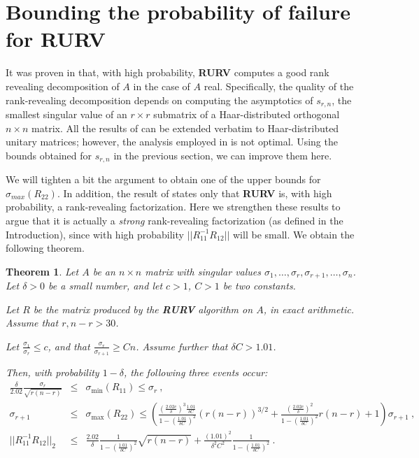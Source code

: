 \documentclass{article}
\newtheorem{theorem}{Theorem}[section]
\theoremstyle{definition}
\newcommand{\smin}{s_{r,n}}
\begin{document}
\section{Bounding the probability of failure for RURV}

It was proven in \cite{DDH07} that, with high probability, \textbf{RURV} computes a good rank revealing decomposition of $A$ in the case of $A$ real. Specifically, the quality of the rank-revealing decomposition depends on computing the asymptotics of $\smin$, the smallest singular value of an $r \times r$ submatrix of a Haar-distributed orthogonal $n \times n$ matrix. All the results of \cite{DDH07} can be extended verbatim to Haar-distributed unitary matrices; however, the analysis employed in \cite{DDH07} is not optimal. Using the bounds obtained for $\smin$ in the previous section, we can improve them here. 

We will tighten a bit the argument to obtain one of the upper bounds for $\sigma_{max}(R_{22})$. In addition, the result of \cite{DDH07} states only that \textbf{RURV} is, with high probability, a rank-revealing factorization. Here we strengthen these
results to argue that it is actually a \emph{strong} rank-revealing
factorization (as defined in the Introduction), since with high probability $||R_{11}^{-1} R_{12}||$ will be small. We obtain the following theorem. 


\begin{theorem} \label{thm_rurv}  Let $A$ be an $n \times n$ matrix
  with singular values $\sigma_1, \ldots, \sigma_r, \sigma_{r+1},
  \ldots, \sigma_n$. Let $\delta>0$ be a small number, and let $c>1$, $C >1$ be two constants. 

Let $R$ be the matrix produced by the \textbf{RURV} algorithm on $A$, \emph{in
    exact arithmetic}.  Assume that $r, n-r > 30$. 

Let $\frac{\sigma_1}{\sigma_r} \leq c$, and that $\frac{\sigma_{r}}{\sigma_{r+1}} \geq C n$. Assume further that $\delta C > 1.01$. 

Then, with probability $1-\delta$, the following three events occur:
\begin{eqnarray}
\label{unu} \frac{\delta}{2.02} \frac{\sigma_{r}}{\sqrt{r (n-r)}} & \leq & \sigma_{\min}(R_{11}) \leq \sigma_r ~,\\ 
\label{doi} \sigma_{r+1} & \leq & \sigma_{\max} (R_{22}) \leq \left ( \frac{\left ( \frac{2.02 c}{\delta} \right)^3 \frac{1.01}{\delta C}}{1- \left ( \frac{1.01}{\delta C} \right)^2} (r(n-r))^{3/2} +  \frac{\left ( \frac{2.02 c}{\delta} \right)^2}{1 -\left ( \frac{1.01}{\delta C} \right)^2} r(n-r) + 1 \right ) \sigma_{r+1}~,\\
\label{trei} ||R_{11}^{-1} R_{12}||_2 & \leq & \frac{2.02}{\delta} \frac{1}{1-\left ( \frac{1.01}{\delta C} \right)^{2}} \sqrt{r (n-r)} + \frac{(1.01)^2}{\delta^2 C^2} \frac{1}{1 - \left ( \frac{1.01}{\delta C} \right)^2} ~.
\end{eqnarray}
\end{theorem}
\end{document}
